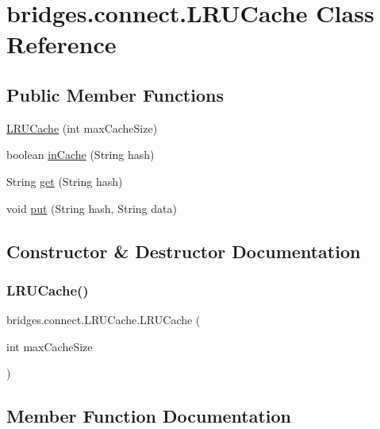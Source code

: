 \hypertarget{classbridges_1_1connect_1_1_l_r_u_cache}{}\section{bridges.\+connect.\+L\+R\+U\+Cache Class Reference}
\label{classbridges_1_1connect_1_1_l_r_u_cache}
\subsection*{Public Member Functions}
\begin{DoxyCompactItemize}
\item 
\mbox{\hyperlink{classbridges_1_1connect_1_1_l_r_u_cache_a185b67de20303aa82abb39217f9a72e2}{L\+R\+U\+Cache}} (int max\+Cache\+Size)
\item 
boolean \mbox{\hyperlink{classbridges_1_1connect_1_1_l_r_u_cache_a5938ded50f8bd542d962c5c23323f642}{in\+Cache}} (String hash)
\item 
String \mbox{\hyperlink{classbridges_1_1connect_1_1_l_r_u_cache_a8b7be0971c4809fa3b413d3ab4b22869}{get}} (String hash)
\item 
void \mbox{\hyperlink{classbridges_1_1connect_1_1_l_r_u_cache_adfffe429c76956850b1038e372eec2eb}{put}} (String hash, String data)
\end{DoxyCompactItemize}


\subsection{Constructor \& Destructor Documentation}
\mbox{\label{classbridges_1_1connect_1_1_l_r_u_cache_a185b67de20303aa82abb39217f9a72e2}} 
\subsubsection{\texorpdfstring{LRUCache()}{LRUCache()}}
{\footnotesize\ttfamily bridges.\+connect.\+L\+R\+U\+Cache.\+L\+R\+U\+Cache (\begin{DoxyParamCaption}\item[{int}]{max\+Cache\+Size }\end{DoxyParamCaption})}



\subsection{Member Function Documentation}
\mbox{\label{classbridges_1_1connect_1_1_l_r_u_cache_a8b7be0971c4809fa3b413d3ab4b22869}} 

